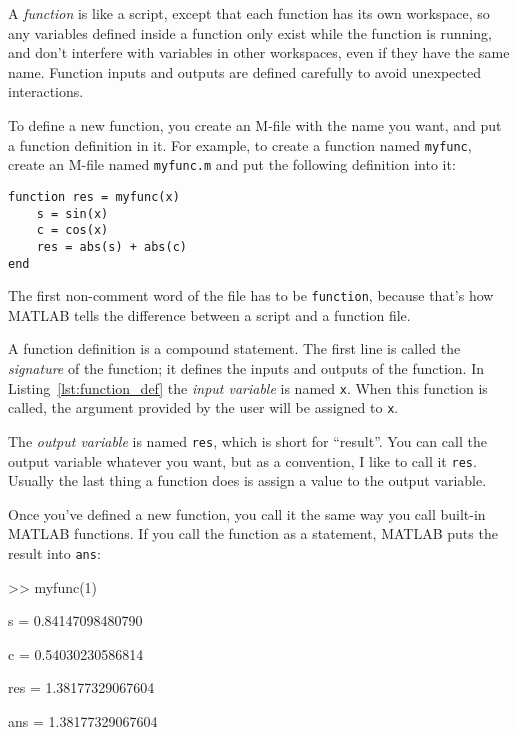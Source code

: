 A {\em function} is like a script, except that each function has its own workspace, so any variables defined
inside a function only exist while the function is running, and don't
interfere with variables in other workspaces, even if they have the
same name. 
Function inputs and outputs are defined carefully to avoid
unexpected interactions.

To define a new function, you create an M-file with the name you
want, and put a function definition in it.  For example, to create
a function named {\tt myfunc}, create an M-file named {\tt myfunc.m}
and put the following definition into it:


\begin{lstlisting}[caption={A function definition}, label={lst:function_def}]
function res = myfunc(x)
    s = sin(x)
    c = cos(x)
    res = abs(s) + abs(c)
end
\end{lstlisting}

The first non-comment word of the file has to be {\tt function}, because
that's how MATLAB tells the difference between a script and a function
file.


A function definition is a compound statement.  The first line
is called the {\em signature} of the function; it defines
the inputs and outputs of the function.  In Listing~\ref{lst:function_def} the {\em input variable} is named {\tt x}.  When this function is called, the
argument provided by the user will be assigned to {\tt x}.



The {\em output variable} is named {\tt res}, which is short for
``result''.  You can call the output variable whatever you want, but
as a convention, I like to call it {\tt res}.  Usually the last
thing a function does is assign a value to the output variable.


Once you've defined a new function, you call it the same way you
call built-in MATLAB functions.  If you call the function as a statement,
MATLAB puts the result into {\tt ans}:

\begin{code}
>> myfunc(1)

s = 0.84147098480790

c = 0.54030230586814

res = 1.38177329067604

ans = 1.38177329067604
\end{code}

